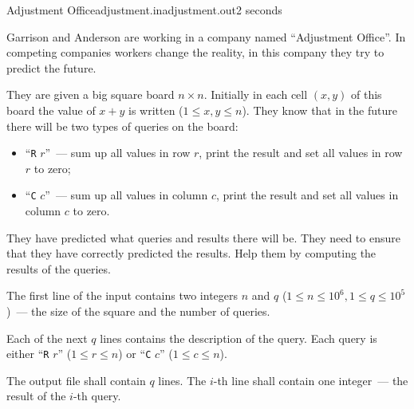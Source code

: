 \begin{problem}{Adjustment Office}{adjustment.in}{adjustment.out}{2 seconds}


Garrison and Anderson are working in a company named ``Adjustment Office''. 
In competing companies workers change the reality, 
in this company they try to predict the future.

They are given a big square board $n \times n$. 
Initially in each cell $(x, y)$ of this board the value of $x + y$ is written ($1 \le x, y \le n$).
They know that in the future there will be two types of queries on the board:
\begin{itemize}
\item ``\texttt{R} $r$''~--- sum up all values in row $r$, print the result and set all values in row $r$ to zero;
\item ``\texttt{C} $c$''~--- sum up all values in column $c$, print the result and set all values in column $c$ to zero.
\end{itemize}

They have predicted what queries and results there will be. 
They need to ensure that they have correctly predicted the results.
Help them by computing the results of the queries.
 
\InputFile

The first line of the input contains two integers $n$ and $q$ ($1 \leq n \leq 10^6, 1 \leq q \leq 10^5$)~---
the size of the square and the number of queries.

Each of the next $q$ lines contains the description of the query.
Each query is either ``\texttt{R} $r$'' ($1 \leq r \leq n$) or ``\texttt{C} $c$'' ($1 \leq c \leq n$).

\OutputFile

The output file shall contain $q$ lines. The $i$-th line shall contain one integer~--- the result of the $i$-th query.

\Example

\begin{example}
%
\end{example}

\end{problem}
